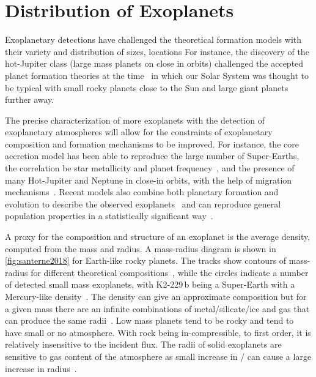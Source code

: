 
\section{Distribution of Exoplanets}

Exoplanetary detections have challenged the theoretical formation models with their variety and distribution of sizes, locations For instance, the discovery of the hot-Jupiter class (large mass planets on close in orbits) challenged the accepted planet formation theories at the time~\citep[.e.g][]{pollack_formation_1996, boss_giant_1997} in which our Solar System was thought to be typical with small rocky planets close to the Sun and large giant planets further away.

The precise characterization of more exoplanets with the detection of exoplanetary atmospheres will allow for the constraints of exoplanetary composition and formation mechanisms to be improved.
For instance, the core accretion model has been able to reproduce the large number of Super-Earths, the correlation be star metallicity and planet frequency~\citep[e.g.][]{santos_spectroscopic_2004, fischer_planetmetallicity_2005}, and the presence of many Hot-Jupiter and Neptune in close-in orbits, with the help of migration mechanisms~\citep[e.g.][]{Triaud_exoplanets_2016}.
Recent models also combine both planetary formation and evolution to describe the observed exoplanets~\citep[e.g.][]{mordasini_characterization_2012} and can reproduce general population properties in a statistically significant way~\citep{mordasini_extrasolar_2009}.

A proxy for the composition and structure of an exoplanet is the average density, computed from the mass and radius.
A mass-radius diagram is shown in \cref{fig:santerne2018} for Earth-like rocky planets.
The tracks show contours of mass-radius for different theoretical compositions~\citep{brugger_constraints_2017}, while the circles indicate a number of detected small mass exoplanets, with {K2-229\,b} being a Super-Earth with a Mercury-like density~\cite{santerne_earthsized_2018}.
The density can give an approximate composition but for a given mass there are an infinite combinations of metal/silicate/ice and gas that can produce the same radii~\citep[e.g.][]{seager_massradius_2007}.
Low mass planets tend to be rocky and tend to have small or no atmosphere. With rock being in-compressible, to first order, it is relatively insensitive to the incident flux.
The radii of solid exoplanets are sensitive to gas content of the atmosphere as small increase in / can cause a large increase in radius~\citep{adams_ocean_2008}.


